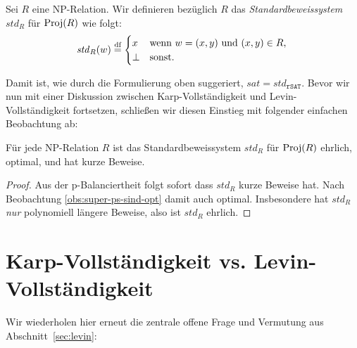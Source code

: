 \begin{definition}
    Sei $R$ eine NP-Relation. Wir definieren bezüglich $R$ das \emph{Standardbeweissystem} $\mathit{std}_R$ für $\operatorname{Proj}(R)$ wie folgt:
    \[ \mathit{std}_R(w) \stackrel{\text{df}}{=} \begin{cases} x & \text{wenn $w=(x,y)$ und $(x,y)\in R$,}\\
    \bot & \text{sonst}.\end{cases} \qedhere \] 
\end{definition}
Damit ist, wie durch die Formulierung oben suggeriert, $\mathit{sat}=\mathit{std}_{\mathtt{rSAT}}$.
Bevor wir nun mit einer Diskussion zwischen Karp-Vollständigkeit und Levin-Vollständigkeit fortsetzen, schließen wir diesen Einstieg mit folgender einfachen Beobachtung ab:
\begin{observation}\label{obs:spps-honest}
    Für jede NP-Relation $R$ ist das Standardbeweissystem $\mathit{std}_R$ für $\operatorname{Proj}(R)$ ehrlich, optimal, und hat kurze Beweise.
\end{observation}
\begin{proof}
    Aus der p-Balanciertheit folgt sofort dass $\mathit{std}_R$ kurze Beweise hat. 
    Nach Beobachtung \ref{obs:super-ps-sind-opt} damit auch optimal.
    Insbesondere hat $\mathit{std}_R$ \emph{nur} polynomiell längere Beweise, also ist $\mathit{std}_R$ ehrlich.
\end{proof}

\section{Karp-Vollständigkeit vs. Levin-Vollständigkeit}\label{sec:karp-vs-levin}

Wir wiederholen hier erneut die zentrale offene Frage und Vermutung aus Abschnitt~\ref{sec:levin}:

\questionkvl*

